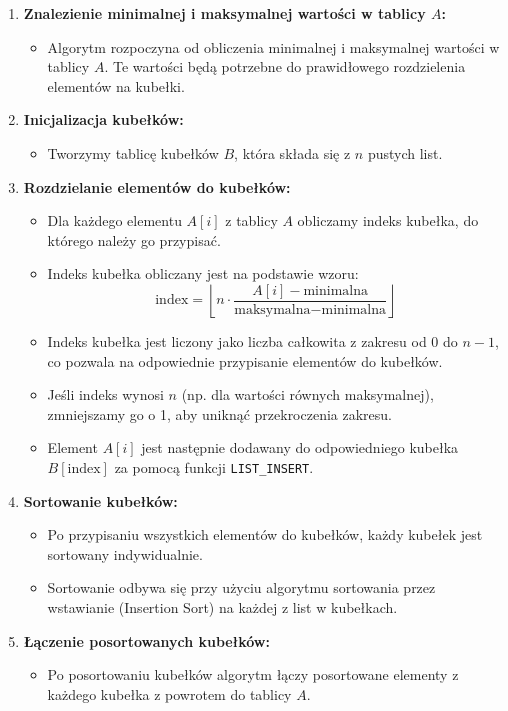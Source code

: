 \documentclass{article}
\begin{document}
			\begin{enumerate}
				\item \textbf{Znalezienie minimalnej i maksymalnej wartości w tablicy \( A \):}
				\begin{itemize}
					\item Algorytm rozpoczyna od obliczenia minimalnej i maksymalnej wartości w tablicy \( A \). Te wartości będą potrzebne do prawidłowego rozdzielenia elementów na kubełki.
				\end{itemize}
				
				\item \textbf{Inicjalizacja kubełków:}
				\begin{itemize}
					\item Tworzymy tablicę kubełków \( B \), która składa się z \( n \) pustych list.
				\end{itemize}
				
				\item \textbf{Rozdzielanie elementów do kubełków:}
				\begin{itemize}
					\item Dla każdego elementu \( A[i] \) z tablicy \( A \) obliczamy indeks kubełka, do którego należy go przypisać.
					\item Indeks kubełka obliczany jest na podstawie wzoru:
					\[
					\text{index} = \left\lfloor n \cdot \frac{A[i] - \text{minimalna}}{\text{maksymalna} - \text{minimalna}} \right\rfloor
					\]
					\item Indeks kubełka jest liczony jako liczba całkowita z zakresu od 0 do \( n-1 \), co pozwala na odpowiednie przypisanie elementów do kubełków.
					\item Jeśli indeks wynosi \( n \) (np. dla wartości równych maksymalnej), zmniejszamy go o 1, aby uniknąć przekroczenia zakresu.
					\item Element \( A[i] \) jest następnie dodawany do odpowiedniego kubełka \( B[\text{index}] \) za pomocą funkcji \texttt{LIST\_INSERT}.
				\end{itemize}
				
				\item \textbf{Sortowanie kubełków:}
				\begin{itemize}
					\item Po przypisaniu wszystkich elementów do kubełków, każdy kubełek jest sortowany indywidualnie.
					\item Sortowanie odbywa się przy użyciu algorytmu sortowania przez wstawianie (Insertion Sort) na każdej z list w kubełkach.
				\end{itemize}
				
				\item \textbf{Łączenie posortowanych kubełków:}
				\begin{itemize}
					\item Po posortowaniu kubełków algorytm łączy posortowane elementy z każdego kubełka z powrotem do tablicy \( A \).
				\end{itemize}
			\end{enumerate}
			
\end{document}
